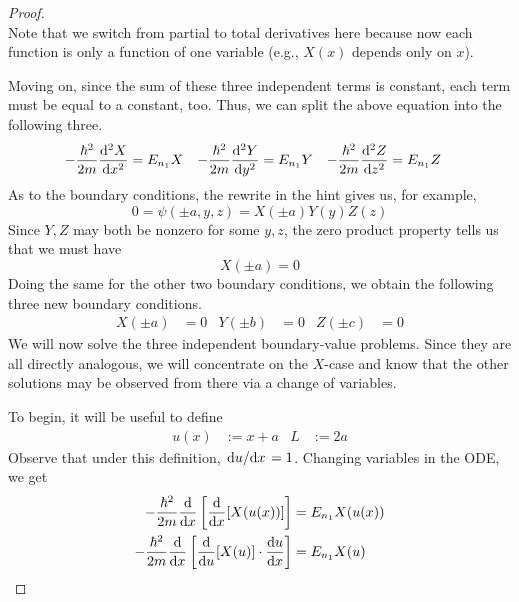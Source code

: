 \documentclass[../psets.tex]{subfiles}
\begin{document}
\begin{enumerate}
\begin{enumerate}
\begin{proof}
\begin{equation*}
            \end{equation*}
            Note that we switch from partial to total derivatives here because now each function is only a function of one variable (e.g., $X(x)$ depends only on $x$).\par
            Moving on, since the sum of these three independent terms is constant, each term must be equal to a constant, too. Thus, we can split the above equation into the following three.
            \begin{align*}
                -\frac{\hbar^2}{2m}\dv[2]{X}{x} &= E_{n_1}X&
                -\frac{\hbar^2}{2m}\dv[2]{Y}{y} &= E_{n_1}Y&
                -\frac{\hbar^2}{2m}\dv[2]{Z}{z} &= E_{n_1}Z
            \end{align*}
            As to the boundary conditions, the rewrite in the hint gives us, for example,
            \begin{equation*}
                0 = \psi(\pm a,y,z) = X(\pm a)Y(y)Z(z)
            \end{equation*}
            Since $Y,Z$ may both be nonzero for some $y,z$, the zero product property tells us that we must have
            \begin{equation*}
                X(\pm a) = 0
            \end{equation*}
            Doing the same for the other two boundary conditions, we obtain the following three new boundary conditions.
            \begin{align*}
                X(\pm a) &= 0&
                Y(\pm b) &= 0&
                Z(\pm c) &= 0
            \end{align*}
            We will now solve the three independent boundary-value problems. Since they are all directly analogous, we will concentrate on the $X$-case and know that the other solutions may be observed from there via a change of variables.\par
            To begin, it will be useful to define
            \begin{align*}
                u(x) &:= x+a&
                L &:= 2a
            \end{align*}
            Observe that under this definition, $\dv*{u}{x}=1$. Changing variables in the ODE, we get
            \begin{align*}
                -\frac{\hbar^2}{2m}\dv{x}\left[ \dv{x}[X(u(x))] \right] &= E_{n_1}X(u(x))\\
                -\frac{\hbar^2}{2m}\dv{x}\left[ \dv{u}[X(u)]\cdot\dv{u}{x} \right] &= E_{n_1}X(u)\\

\end{align*}
\end{proof}
\end{enumerate}
\end{enumerate}
\end{document}

